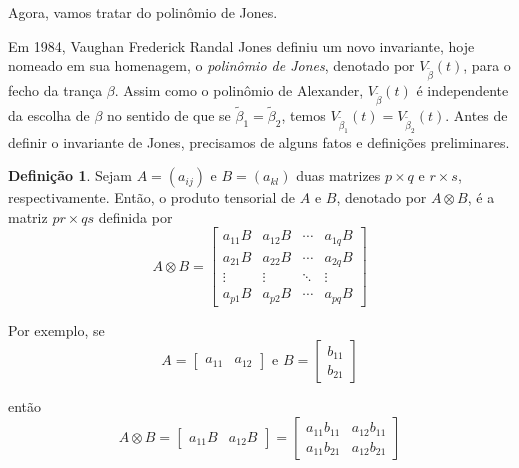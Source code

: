 \documentclass[a4paper,portuguese,11pt,twoside, leqno]{book}
\theoremstyle{definition}
\newtheorem{deff}{Definição}[section]
\begin{document}
	\par \vspace{0.3cm} Agora, vamos tratar do polinômio de Jones.
	\par\vspace{0.3cm} Em 1984, Vaughan Frederick Randal Jones definiu um novo invariante, hoje nomeado em sua homenagem, o \textit{polinômio de Jones}, denotado por $V_{\widetilde{\beta}}(t)$, para o fecho da trança $\beta$. Assim como o polinômio de Alexander, $V_{\widetilde{\beta}}(t)$ é independente da escolha de $\beta$ no sentido de que se $\widetilde{\beta}_1 = \widetilde{\beta}_2$, temos $V_{\widetilde{\beta}_1}(t) = V_{\widetilde{\beta}_2}(t)$. Antes de definir o invariante de Jones, precisamos de alguns fatos e definições preliminares.
	\begin{deff}
		\label{def prod tensorial}
		Sejam $A = (a_{ij})$ e $B = (a_{kl})$ duas matrizes $p\times q$ e $r\times s$, respectivamente. Então, o produto tensorial de $A$ e $B$, denotado por $A\otimes B$, é a matriz $pr\times qs$ definida por
		\begin{equation*}
		A\otimes B = 
		\begin{bmatrix}
		a_{11}B & a_{12}B & \cdots & a_{1q}B \\
		a_{21}B & a_{22}B & \cdots & a_{2q}B \\
		\vdots & \vdots & \ddots & \vdots \\
		a_{p1}B & a_{p2}B & \cdots & a_{pq}B
		\end{bmatrix}
		\end{equation*}
	\end{deff}
	\par\vspace{0.3cm} Por exemplo, se
	\begin{equation*}
	A = \begin{bmatrix}
	a_{11} & a_{12}
	\end{bmatrix}\text{ e } B = \begin{bmatrix}
	b_{11}\\
	b_{21}
	\end{bmatrix} 
	\end{equation*}
	\par\vspace{0.3cm} então
	\begin{equation*}
	A\otimes B = \begin{bmatrix}
	a_{11}B & a_{12}B
	\end{bmatrix} = \begin{bmatrix}
	a_{11}b_{11} & a_{12}b_{11}\\
	a_{11}b_{21} & a_{12}b_{21}
	\end{bmatrix}
	\end{equation*}
\end{document}
